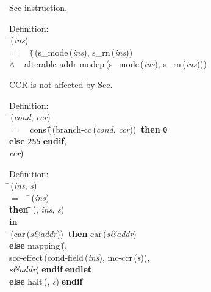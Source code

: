  Scc instruction.
\begin{tabbing}{\sc Definition}: \\  
\=\,({\it{ins\/}}) \\ 
$=$$\;\;\;\;$(\=\,({\rm{s\_mode}}\,({\it{ins\/}}), {\rm{s\_rn}}\,({\it{ins\/}})) \\ 
$\wedge$$\;\;\;\;${\rm{alterable-addr-modep}}\,({\rm{s\_mode}}\,({\it{ins\/}}), {\rm{s\_rn}}\,({\it{ins\/}})))\-\-
\end{tabbing}

 CCR is not affected by Scc.
\begin{tabbing}{\sc Definition}: \\  
\=\,({\it{cond\/}}, {\it{ccr\/}}) \\ 
$=$$\;\;\;\;${\rm{cons}}\,(\=\+\=\,({\rm{branch-cc}}\,({\it{cond\/}}, {\it{ccr\/}}))$\;\;${\bf then }{\tt{0}} \\ 
{\bf else }{\tt{255}}$\;${\bf  endif}\-, \\ 
{\it{ccr\/}})\-\-
\end{tabbing}

\begin{tabbing}{\sc Definition}: \\  
\=\,({\it{ins\/}}, {\it{s\/}}) \\ 
$=$$\;\;\;\;$\=\,({\it{ins\/}}) \\ 
{\bf then }\=\=\,({}, {\it{ins\/}}, {\it{s\/}})\- \\ 
{\bf in} \\ 
\=\,({\rm{car}}\,({\it{s\&addr\/}}))$\;\;${\bf then }{\rm{car}}\,({\it{s\&addr\/}}) \\ 
{\bf else }{\rm{mapping}}\,(\=, \\ 
{\rm{scc-effect}}\,({\rm{cond-field}}\,({\it{ins\/}}), {\rm{mc-ccr}}\,({\it{s\/}})), \\ 
{\it{s\&addr\/}})\-$\;${\bf  endif}\-$\;${\bf  endlet}\- \\ 
{\bf else }{\rm{halt}}\,({}, {\it{s\/}})$\;${\bf  endif}\-\-
\end{tabbing}

